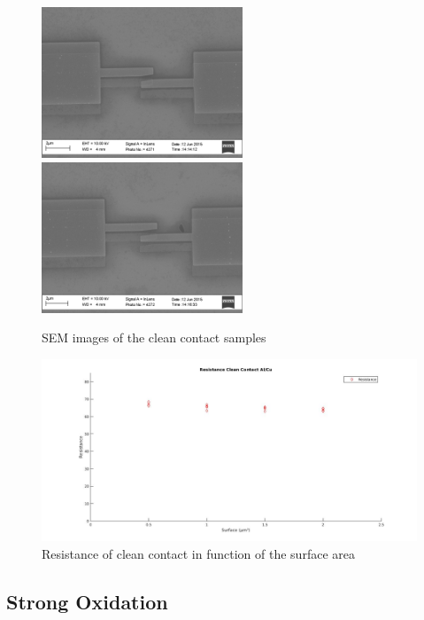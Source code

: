                 \begin{figure}
                    \centering
                    \includegraphics[width=6cm]{SEMtest12_1.png}
                    \includegraphics[width=6cm]{SEMtest12_2.png}
                    \caption{SEM images of the clean contact samples}
                    \label{SEMcleancontact}
                \end{figure}
                
                \begin{figure}
                    \centering
                    \includegraphics[width=12cm]{RClean.jpg}
                    \caption{Resistance of clean contact in function of the surface area}
                    \label{cleancontact}
                \end{figure}
                
                \subsection{Strong Oxidation}
                
